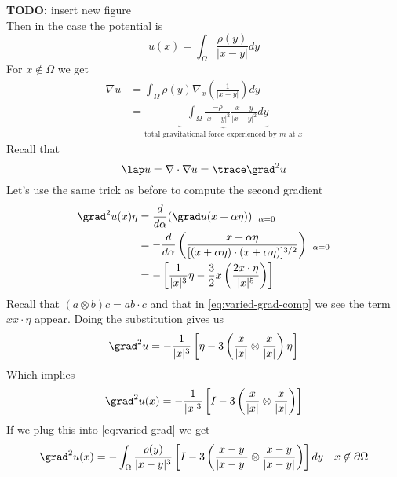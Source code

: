 \documentclass{bkcnotes}
\newcommand{\todo}[1]{{\bf TODO: } #1\\}
\begin{document}
\todo{insert new figure}

Then in the case the potential is
\begin{equation}
  \label{eq:varied-potential}
  u(x) = \int_\Omega \frac{\rho(y)}{|x-y|}dy
\end{equation}
For $x \not\in \overline{\Omega}$ we get
\begin{equation}
  \label{eq:varied-grad}
  \begin{aligned}
    \nabla u &= \int_{\Omega} \rho(y) \nabla_x\left(\frac{1}{|x-y|}\right)dy \\
    &= \underbrace{-\int_{\Omega} \frac{-\rho}{|x-y|^2}\frac{x-y}{|x-y|^2}dy}_{
      \text{total gravitational force experienced by } m \text{ at } x
    }
  \end{aligned}
\end{equation}
Recall that
\begin{equation}
  \label{eq:trace-laplacian}
  \lap u = \nabla \cdot \nabla u = \trace \grad^2u
\end{equation}
Let's use the same trick as before to compute the second gradient
\begin{equation}
  \label{eq:varied-grad-comp}
  \begin{aligned}
    \grad^2 u(x)\eta &= \frac{d}{d\alpha}(\grad u(x+\alpha\eta))\mid_{\alpha = 0} \\
    &= -\frac{d}{d\alpha}\left(\frac{x+\alpha\eta}
      {[(x+\alpha\eta) \cdot (x+\alpha\eta)]^{3/2}}\right) \mid_{\alpha=0} \\
    &= -\left[ \frac{1}{|x|^3}\eta - \frac{3}{2}x\left(
        \frac{2x\cdot\eta}{|x|^5}\right)\right]
  \end{aligned}
\end{equation}
Recall that $(a \otimes b)c = a b\cdot c$ and that in
\eqref{eq:varied-grad-comp} we see the term $x x\cdot\eta$
appear. Doing the substitution gives us
\begin{equation}
  \label{eq:finish-grad-comp}
  \grad^2 u = -\frac{1}{|x|^3}\left[
    \eta - 3\left(\frac{x}{|x|} \otimes \frac{x}{|x|}\right)\eta
  \right]
\end{equation}
Which implies
\begin{equation}
  \label{eq:snd-grad}
  \grad^2 u(x) = -\frac{1}{|x|^3}\left[
    I - 3\left(\frac{x}{|x|} \otimes \frac{x}{|x|}\right)
  \right]
\end{equation}
If we plug this into \eqref{eq:varied-grad} we get
\begin{equation}
  \label{eq:snd-grad-int}
  \begin{aligned}
    \grad^2 u(x) = -\int_{\Omega} \frac{\rho(y)}{|x-y|^3}\left[
      I - 3\left(\frac{x-y}{|x-y|} \otimes \frac{x-y}{|x-y|}\right)
    \right]dy && x\not\in\partial\Omega
  \end{aligned}
\end{equation}
\end{document}
